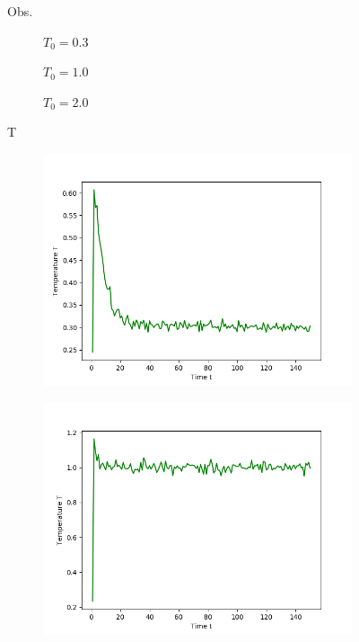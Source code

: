 \begin{figure}[ht]

Obs.
\hfill
\begin{subfigure}{0.3\textwidth}
\centering
$T_0 = 0.3$
\end{subfigure}
\hfill
\begin{subfigure}{0.3\textwidth}
\centering
$T_0 = 1.0$
\end{subfigure}
\hfill
\begin{subfigure}{0.3\textwidth}
\centering
$T_0 = 2.0$
\end{subfigure}

T
\hfill
\begin{subfigure}{0.3\textwidth}
\includegraphics[width=\textwidth]{../dat/Temperature_T0d3.png}
\end{subfigure}
\hfill
\begin{subfigure}{0.3\textwidth}
\includegraphics[width=\textwidth]{../dat/Temperature_T1d0.png}

\end{subfigure}
\end{figure}
